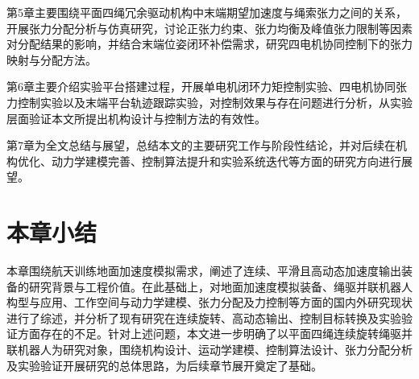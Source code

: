 第5章主要围绕平面四绳冗余驱动机构中末端期望加速度与绳索张力之间的关系，开展张力分配分析与仿真研究，讨论正张力约束、张力均衡及峰值张力限制等因素对分配结果的影响，并结合末端位姿闭环补偿需求，研究四电机协同控制下的张力映射与分配方法。

第6章主要介绍实验平台搭建过程，开展单电机闭环力矩控制实验、四电机协同张力控制实验以及末端平台轨迹跟踪实验，对控制效果与存在问题进行分析，从实验层面验证本文所提出机构设计与控制方法的有效性。

第7章为全文总结与展望，总结本文的主要研究工作与阶段性结论，并对后续在机构优化、动力学建模完善、控制算法提升和实验系统迭代等方面的研究方向进行展望。

\section{本章小结}

本章围绕航天训练地面加速度模拟需求，阐述了连续、平滑且高动态加速度输出装备的研究背景与工程价值。在此基础上，对地面加速度模拟装备、绳驱并联机器人构型与应用、工作空间与动力学建模、张力分配及力控制等方面的国内外研究现状进行了综述，并分析了现有研究在连续旋转、高动态输出、控制目标转换及实验验证方面存在的不足。针对上述问题，本文进一步明确了以平面四绳连续旋转绳驱并联机器人为研究对象，围绕机构设计、运动学建模、控制算法设计、张力分配分析及实验验证开展研究的总体思路，为后续章节展开奠定了基础。


